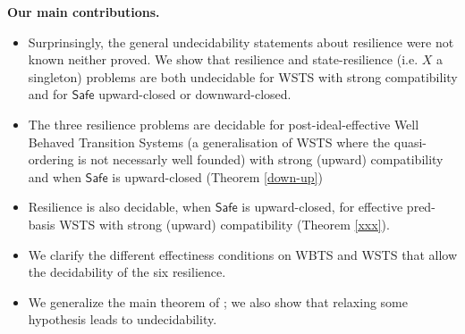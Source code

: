 \documentclass[runningheads]{llncs}
\newcommand{\pred}{\textsf{pred}}
\newcommand{\post}{\textsf{post}}
\newcommand{\Safe}{\textsf{Safe}}
\begin{document}
\noindent
{\bf Our main contributions.}
\begin{itemize}
\item Surprinsingly, the general undecidability statements about resilience were not known neither proved. We show that resilience and {state-resilience} (i.e. $X$ a singleton) problems are both undecidable for WSTS with strong compatibility and for $\Safe$ upward-closed or downward-closed. 
\item The three resilience problems are decidable for post-ideal-effective Well Behaved Transition Systems (a generalisation of WSTS where the quasi-ordering is not necessarly well founded) with strong (upward) compatibility and when $\Safe$ is upward-closed (Theorem \ref{down-up})
%
\item  Resilience is also decidable, when 
$\Safe$ is upward-closed, for effective pred-basis WSTS with strong (upward) compatibility (Theorem \ref{xxx}).
%
%
%
\item We clarify the different effectiness conditions on WBTS and WSTS that allow the decidability of the six resilience.
%
\item We generalize  the main theorem of \cite{DBLP:journals/corr/abs-2108-00889,DBLP:conf/gg/Ozkan22} ; we also show that relaxing some hypothesis leads to undecidability.
%
%


\end{itemize}
\end{document}
